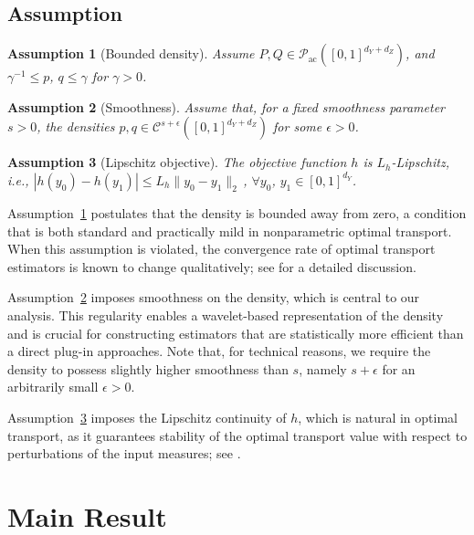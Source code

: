 \documentclass{article}
\theoremstyle{plain}
\newtheorem{assumption}{Assumption}[section]
\theoremstyle{definition}
\def\calC{\mathcal{C}}
\theoremstyle{plain}
\def\calC{\mathcal{C}}
\begin{document}
\subsection{Assumption}
\begin{assumption}[Bounded density]\label{a:boundedness_assp}
 Assume $P, Q \in \mathcal{P}_{\mathrm{ac}}([0,1]^{d_Y + d_Z})$, and $\gamma^{-1} \leq p$, $q \leq \gamma$ for $\gamma > 0$.
\end{assumption}

\begin{assumption}[Smoothness]\label{a:density_smooth}
 Assume that, for a fixed smoothness parameter $s>0$, the densities $p, q \in\calC^{s+\epsilon}([0,1]^{d_Y + d_Z})$ for some $\epsilon > 0$.
\end{assumption}

\begin{assumption}[Lipschitz objective]\label{a:Lip_obj}
    The objective function $h$ is $L_h$-Lipschitz, i.e., $|h(y_0) - h(y_1)| \leq L_h \|y_0 - y_1\|_2\,$, $ \forall y_0$, $y_1 \in [0,1]^{d_Y}$.
\end{assumption}


Assumption~\ref{a:boundedness_assp} postulates that the density is bounded away from zero, a condition that is both standard and practically mild in nonparametric optimal transport. When this assumption is violated, the convergence rate of optimal transport estimators is known to change qualitatively; see \cite[Section~5]{niles2022minimax} for a detailed discussion.

Assumption~\ref{a:density_smooth} imposes smoothness on the density, which is central to our analysis. This regularity enables a wavelet-based representation of the density and is crucial for constructing estimators that are statistically more efficient than a direct plug-in approaches. Note that, for technical reasons, we require the density to possess slightly higher smoothness than $s$, namely $s + \epsilon$ for an arbitrarily small $\epsilon > 0$.

Assumption~\ref{a:Lip_obj} imposes the Lipschitz continuity of $h$, which is natural in optimal transport,
as it guarantees stability of the optimal transport value with respect to perturbations of the input measures; see \parencite{villani2003topics}. 


\section{Main Result}\label{sec:estimation}
\end{document}
